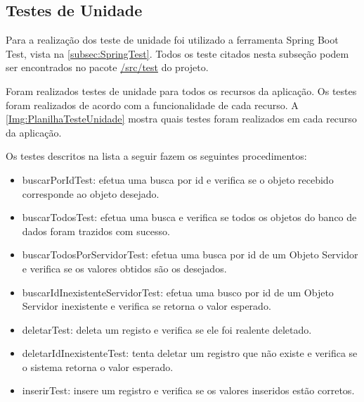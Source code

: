 \subsection{Testes de Unidade}\label{}

Para a realização dos teste de unidade foi utilizado a ferramenta Spring Boot Test, vista na \autoref{subsec:SpringTest}. Todos os teste citados nesta subseção podem ser encontrados no pacote \url{/src/test} do projeto.

Foram realizados testes de unidade para todos os recursos da aplicação. Os testes foram realizados de acordo com a funcionalidade de cada recurso. A \autoref{Img:PlanilhaTesteUnidade} mostra quais testes foram realizados em cada recurso da aplicação.

Os testes descritos na lista a seguir fazem os seguintes procedimentos:

\begin{itemize}
    \item buscarPorIdTest: efetua uma busca por id e verifica se o objeto recebido corresponde ao objeto desejado.
    
    \item buscarTodosTest: efetua uma busca e verifica se todos os objetos do banco de dados foram trazidos com sucesso.
    
    \item buscarTodosPorServidorTest: efetua uma busca por id de um Objeto Servidor e verifica se os valores obtidos são os desejados.
    
    \item buscarIdInexistenteServidorTest: efetua uma busco por id de um Objeto Servidor inexistente e verifica se retorna o valor esperado.
    
    \item deletarTest: deleta um registo e verifica se ele foi realente deletado.
    
    \item deletarIdInexistenteTest: tenta deletar um registro que não existe e verifica se o sistema retorna o valor esperado.
    
    \item inserirTest: insere um registro e verifica se os valores inseridos estão corretos.
\end{itemize}
 

